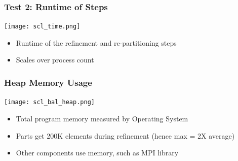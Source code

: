 \documentclass{beamer}
\begin{document}
\begin{frame}
\frametitle{Test 2: Runtime of Steps}
\begin{center}
\texttt{[image: scl\_time.png]}
\end{center}
\begin{itemize}
\item Runtime of the refinement and re-partitioning steps
\item Scales over process count
\end{itemize}
\end{frame}

\begin{frame}
\frametitle{Heap Memory Usage}
\begin{center}
\texttt{[image: scl\_bal\_heap.png]}
\end{center}
\begin{itemize}
\item Total program memory measured by Operating System
\item Parts get 200K elements during refinement
(hence max = 2X average)
\item Other components use memory, such as MPI library
\end{itemize}
\end{frame}

\end{document}
